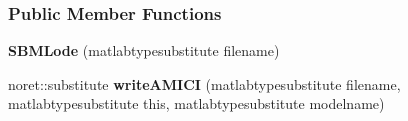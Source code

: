 \subsubsection*{Public Member Functions}
\begin{DoxyCompactItemize}
\item 
\hypertarget{class_s_b_m_lode_a2cd0d930d07eaf96753131799d7bdc9c}{}{\bfseries S\+B\+M\+Lode} (matlabtypesubstitute filename)\label{class_s_b_m_lode_a2cd0d930d07eaf96753131799d7bdc9c}

\item 
\hypertarget{class_s_b_m_lode_acec53dca9922c09c88e57eb531571c07}{}noret\+::substitute {\bfseries write\+A\+M\+I\+C\+I} (matlabtypesubstitute filename, matlabtypesubstitute this, matlabtypesubstitute modelname)\label{class_s_b_m_lode_acec53dca9922c09c88e57eb531571c07}

\end{DoxyCompactItemize}
